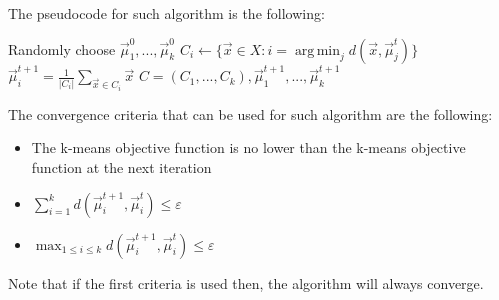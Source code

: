 \documentclass[a4paper,11pt,oneside]{book}
\DeclareMathOperator*{\argmin}{arg\,min}
\begin{document}
\begin{enumerate}
\begin{solution}
        The pseudocode for such algorithm is the following:
        
        \begin{algorithmic}[1]
        \State Randomly choose $\vec{\mu}_1^0,...,\vec{\mu}_k^0$
            \State $C_i \gets \{\vec{x} \in X : i = \argmin_j d(\vec{x},\vec{\mu}_j^t)\}$
        \EndFor
            \State $\vec{\mu}_i^{t+1} = \frac{1}{|C_i|}\sum_{\vec{x}\in C_i} \vec{x}$
        \EndFor
            \State \Return $C = (C_1,...,C_k), \vec{\mu}_1^{t+1},...,\vec{\mu}_k^{t+1}$
        \EndIf
        \EndFor
        \end{algorithmic}
        
        The convergence criteria that can be used for such algorithm are the following:
        \begin{itemize}
        \item The k-means objective function is no lower than the k-means objective function at the next iteration
        \item $\sum_{i=1}^k d(\vec{\mu}_i^{t+1},\vec{\mu}_i^t) \leq \varepsilon$
        \item $\max_{1\leq i\leq k}d(\vec{\mu}_i^{t+1},\vec{\mu}_i^t) \leq \varepsilon$
        \end{itemize}
        
        Note that if the first criteria is used then, the algorithm will always converge.
        

\end{solution}
\end{enumerate}
\end{document}
